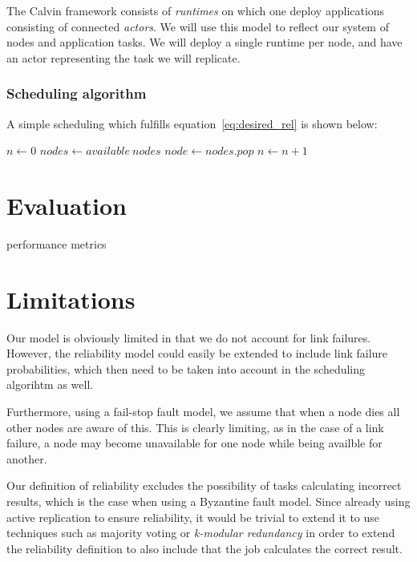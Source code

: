 \documentclass{cslthse-msc}
\begin{document}
The Calvin framework consists of \emph{runtimes} on which one deploy applications consisting of connected \emph{actors}. We will use this model to reflect our system of nodes and application tasks. We will deploy a single runtime per node, and have an actor representing the task we will replicate.


\subsection{Scheduling algorithm}
A simple scheduling which fulfills equation~\ref{eq:desired_rel} is shown below:

\begin{algorithmic}
\State $n\gets 0$
\State $nodes\gets available\ nodes$
	\State $node\gets nodes.pop$
	\State $n\gets n + 1$
\EndWhile
\end{algorithmic}

\chapter{Evaluation} \label{ch:evaluation}
performance metrics

\chapter{Limitations} \label{ch:limitations}

Our model is obviously limited in that we do not account for link failures. However, the reliability model could easily be extended to include link failure probabilities, which then need to be taken into account in the scheduling algorihtm as well.

Furthermore, using a fail-stop fault model, we assume that when a node dies all other nodes are aware of this. This is clearly limiting, as in the case of a link failure, a node may become unavailable for one node while being availble for another.

Our definition of reliability excludes the possibility of tasks calculating incorrect results, which is the case when using a Byzantine fault model. Since already using active replication to ensure reliability, it would be trivial to extend it to use techniques such as majority voting or \emph{k-modular redundancy} in order to extend the reliability definition to also include that the job calculates the correct result.
\end{document}
